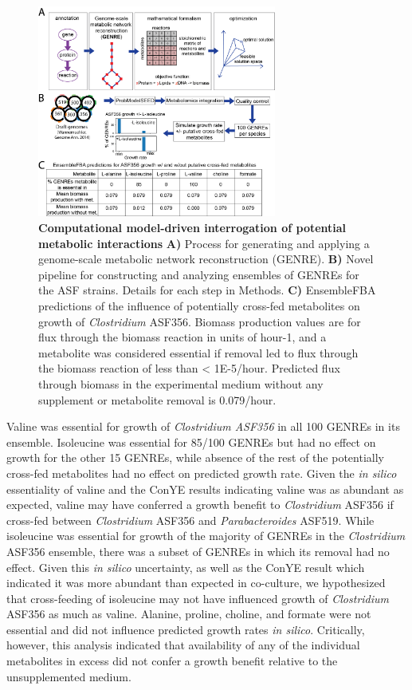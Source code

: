 \documentclass[11pt,onecolumn,notitlepage,openany,twoside]{book}
\begin{document}
\begin{refsection}
\begin{figure}[tb]
\centering
\includegraphics[width=0.7\textwidth]{ch2_figS3}
\caption[Computational model-driven interrogation of potential metabolic interactions and experimental validation of a cross-feeding interaction.]{\textbf{Computational model-driven interrogation of potential metabolic interactions}  \textbf{A)} Process for generating and applying a genome-scale metabolic network reconstruction (GENRE). \textbf{B)} Novel pipeline for constructing and analyzing ensembles of GENREs for the ASF strains. Details for each step in Methods. \textbf{C)} EnsembleFBA predictions of the influence of potentially cross-fed metabolites on growth of \textit{Clostridium} ASF356. Biomass production values are for flux through the biomass reaction in units of hour-1, and a metabolite was considered essential if removal led to flux through the biomass reaction of less than \textless\! 1E-5/hour. Predicted flux through biomass in the experimental medium without any supplement or metabolite removal is 0.079/hour.}
\end{figure}

Valine was essential for growth of \textit{Clostridium ASF356} in all 100 GENREs in its ensemble. Isoleucine was essential for 85/100 GENREs but had no effect on growth for the other 15 GENREs, while absence of the rest of the potentially cross-fed metabolites had no effect on predicted growth rate. Given the \textit{in silico} essentiality of valine and the ConYE results indicating valine was as abundant as expected, valine may have conferred a growth benefit to \textit{Clostridium} ASF356 if cross-fed between \textit{Clostridium} ASF356 and \textit{Parabacteroides} ASF519. While isoleucine was essential for growth of the majority of GENREs in the \textit{Clostridium} ASF356 ensemble, there was a subset of GENREs in which its removal had no effect. Given this \textit{in silico} uncertainty, as well as the ConYE result which indicated it was more abundant than expected in co-culture, we hypothesized that cross-feeding of isoleucine may not have influenced growth of \textit{Clostridium} ASF356 as much as valine. Alanine, proline, choline, and formate were not essential and did not influence predicted growth rates \textit{in silico}. Critically, however, this analysis indicated that availability of any of the individual metabolites in excess did not confer a growth benefit relative to the unsupplemented medium.


\end{refsection}
\end{document}
